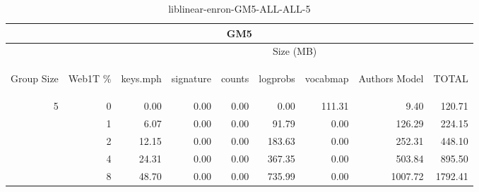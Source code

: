 \begin{center}
\begin{table}[htbp] 
 \begin{center}
\begin{tabular}{ | r | r | r | r | r | r | r | r | r |}
\hline
\multicolumn{9}{|c|}{GM5}\\
\hline
 & & \multicolumn{7}{|c|}{Size (MB)}\\ \cline{3-9}
\begin{sideways}Group Size\end{sideways} & \begin{sideways}Web1T \% \end{sideways} & \begin{sideways}keys.mph\end{sideways} & \begin{sideways}signature\end{sideways} & \begin{sideways}counts\end{sideways} & \begin{sideways}logprobs\end{sideways} & \begin{sideways}vocabmap\end{sideways} & \begin{sideways}Authors Model \end{sideways} & \begin{sideways}TOTAL\end{sideways}\\
\hline
\multirow{4}{*}{5}
 & 0 & 0.00 & 0.00 & 0.00 & 0.00 & 111.31 & 9.40 & 120.71\\ \cline{2-9}
 & 1 & 6.07 & 0.00 & 0.00 & 91.79 & 0.00 & 126.29 & 224.15\\ \cline{2-9}
 & 2 & 12.15 & 0.00 & 0.00 & 183.63 & 0.00 & 252.31 & 448.10\\ \cline{2-9}
 & 4 & 24.31 & 0.00 & 0.00 & 367.35 & 0.00 & 503.84 & 895.50\\ \cline{2-9}
 & 8 & 48.70 & 0.00 & 0.00 & 735.99 & 0.00 & 1007.72 & 1792.41\\ \cline{2-9}
\hline
\end{tabular}
\caption{liblinear-enron-GM5-ALL-ALL-5}
\label{table:liblinear-enron-GM5-ALL-ALL-5}
\end{center}
 \end{table}
\end{center}


